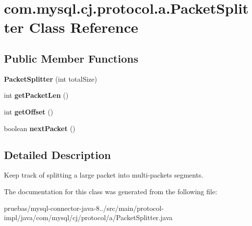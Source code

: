 \hypertarget{classcom_1_1mysql_1_1cj_1_1protocol_1_1a_1_1_packet_splitter}{}\section{com.\+mysql.\+cj.\+protocol.\+a.\+Packet\+Splitter Class Reference}
\label{classcom_1_1mysql_1_1cj_1_1protocol_1_1a_1_1_packet_splitter}
\subsection*{Public Member Functions}
\begin{DoxyCompactItemize}
\item 
\mbox{\label{classcom_1_1mysql_1_1cj_1_1protocol_1_1a_1_1_packet_splitter_a8ca8ac21ce49ca14892f6df1c407e316}} 
{\bfseries Packet\+Splitter} (int total\+Size)
\item 
\mbox{\label{classcom_1_1mysql_1_1cj_1_1protocol_1_1a_1_1_packet_splitter_a0d8595300e2493752ea6acc57e4862f1}} 
int {\bfseries get\+Packet\+Len} ()
\item 
\mbox{\label{classcom_1_1mysql_1_1cj_1_1protocol_1_1a_1_1_packet_splitter_a7793518d23e90460aa52781feff949f8}} 
int {\bfseries get\+Offset} ()
\item 
\mbox{\label{classcom_1_1mysql_1_1cj_1_1protocol_1_1a_1_1_packet_splitter_a459dc7fa27caddbb835946d20e8c9bf9}} 
boolean {\bfseries next\+Packet} ()
\end{DoxyCompactItemize}


\subsection{Detailed Description}
Keep track of splitting a large packet into multi-\/packets segments. 

The documentation for this class was generated from the following file\+:\begin{DoxyCompactItemize}
\item 
pruebas/mysql-\/connector-\/java-\/8../src/main/protocol-\/impl/java/com/mysql/cj/protocol/a/Packet\+Splitter.\+java\end{DoxyCompactItemize}

